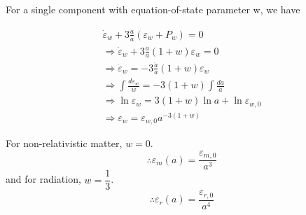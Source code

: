 \documentclass[a4,10pt,oneside]{report}
\begin{document}
   For a single component with equation-of-state parameter w, we have
   
   \begin{eqnarray}
	   \dot{\varepsilon}_w + 3\frac{\dot{a}}{a}(\varepsilon_w + P_w) = 0 \\
	   \Rightarrow \dot{\varepsilon}_w + 3\frac{\dot{a}}{a}(1+w)\varepsilon_w = 0 \\
	   \Rightarrow \dot{\varepsilon}_w = -3\frac{\dot{a}}{a}(1+w)\varepsilon_w \\
	   \Rightarrow \int \frac{d\varepsilon_w}{w} = -3(1+w)\int \frac{da}{a} \\
	   \Rightarrow \ln \varepsilon_w = 3(1+w) \ln a + \ln \varepsilon_{w,0} \\
	   \Rightarrow \varepsilon_w = \varepsilon_{w,0} a^{-3(1+w)} 
   \end{eqnarray}
   
   For non-relativistic matter, $ w=0 $.
   \begin{equation}\label{key}
	   \therefore \varepsilon_m(a) = \frac{\varepsilon_{m,0}}{a^3}
   \end{equation}
   and for radiation, $ w=\dfrac{1}{3} $.
   \begin{equation}\label{key}
	   \therefore \varepsilon_r(a) = \frac{\varepsilon_{r,0}}{a^4}
   \end{equation}
\end{document}
